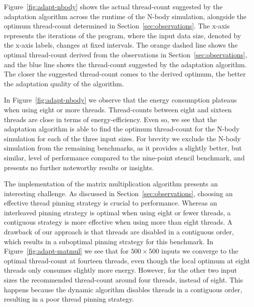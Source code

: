 Figure~\ref{fig:adapt-nbody} shows the actual thread-count suggested by the adaptation algorithm across the runtime of the N-body simulation, alongside the optimum thread-count determined in Section~\ref{sec:observations}.
The x-axis represents the iterations of the program, where the input data size, denoted by the x-axis labels, changes at fixed intervals.
The orange dashed line shows the optimal thread-count derived from the observations in Section~\ref{sec:observations}, and the blue line shows the thread-count suggested by the adaptation algorithm.
The closer the suggested thread-count comes to the derived optimum, the better the adaptation quality of the algorithm.

In Figure~\ref{fig:adapt-nbody} we observe that the energy consumption plateaus when using eight or more threads.
Thread-counts between eight and sixteen threads are close in terms of energy-efficiency.
Even so, we see that the adaptation algorithm is able to find the optimum thread-count for the N-body simulation for each of the three input sizes.
For brevity we exclude the N-body simulation from the remaining benchmarks, as it provides a slightly better, but similar, level of performance compared to the nine-point stencil benchmark, and presents no further noteworthy results or insights.

The \sac{} implementation of the matrix multiplication algorithm presents an interesting challenge.
As discussed in Section~\ref{sec:observations}, choosing an effective thread pinning strategy is crucial to performance.
Whereas an interleaved pinning strategy is optimal when using eight or fewer threads, a contiguous strategy is more effective when using more than eight threads.
A drawback of our approach is that threads are disabled in a contiguous order, which results in a suboptimal pinning strategy for this benchmark.
In Figure~\ref{fig:adapt-matmul} we see that for $500 \times 500$ inputs we converge to the optimal thread-count at fourteen threads, even though the local optimum at eight threads only consumes slightly more energy.
However, for the other two input sizes the recommended thread-count around four threads, instead of eight.
This happens because the dynamic algorithm disables threads in a contiguous order, resulting in a poor thread pinning strategy.

